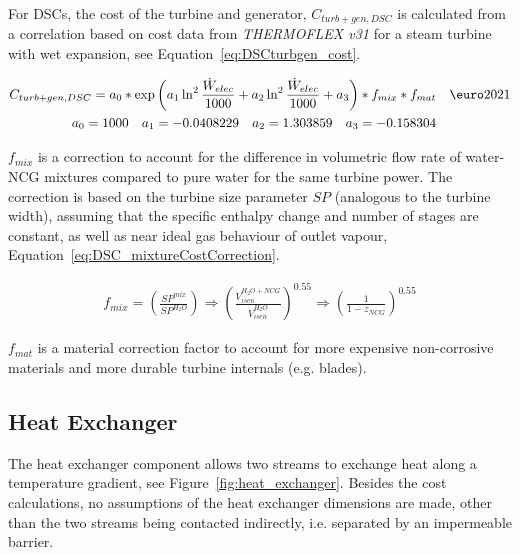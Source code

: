         For \ac{DSC}s, the cost of the turbine and generator, \(C_{turb+gen, DSC}\) is calculated from a correlation based on cost data from \emph{THERMOFLEX v31} \cite{Thermoflex2021} for a steam turbine with wet expansion, see Equation~\ref{eq:DSCturbgen_cost}. 

        \begin{equation}
            \label{eq:DSCturbgen_cost}
            \begin{aligned}
                C_{turb+gen, DSC} = a_0*\exp \left(a_1\ln^2\frac{\Dot{W}_{elec}}{1000} + a_2\ln^2\frac{\Dot{W}_{elec}}{1000} + a_3\right)*f_{mix}*f_{mat} &  \quad \textup{\euro}2021 \\
                a_0=1000 \quad a_1=-0.0408229 \quad a_2=1.303859 \quad a_3=-0.158304 &
            \end{aligned}
        \end{equation}

        \(f_{mix}\) is a correction to account for the difference in volumetric flow rate of water-\ac{NCG} mixtures compared to pure water for the same turbine power. The correction is based on the turbine size parameter \(SP\) (analogous to the turbine width), assuming that the specific enthalpy change and number of stages are constant, as well as near ideal gas behaviour of outlet vapour, Equation~\ref{eq:DSC_mixtureCostCorrection}. 
        
        \begin{align}
            f_{mix} = \left(\frac{SP^{mix}}{SP^{H_2O}} \right) \Rightarrow  \left(\frac{\Dot{V}_{isen}^{H_2O+NCG}}{\Dot{V}_{isen}^{H_2O}} \right) ^{0.55} \Rightarrow \left(\frac{1}{1 - z_{NCG}} \right) ^{0.55}  \label{eq:DSC_mixtureCostCorrection}
        \end{align}
        
        \(f_{mat}\) is a material correction factor to account for more expensive non-corrosive materials and more durable turbine internals (e.g. blades).
        
    \subsection{Heat Exchanger}
        The heat exchanger component allows two streams to exchange heat along a temperature gradient, see Figure~\ref{fig:heat_exchanger}. Besides the cost calculations, no assumptions of the heat exchanger dimensions are made, other than the two streams being contacted indirectly, i.e. separated by an impermeable barrier.

